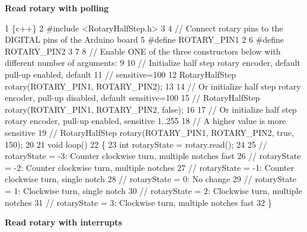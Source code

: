 {\bfseries Read rotary with polling} 
\begin{DoxyCode}
1 \{c++\}
2 #include <RotaryHalfStep.h>
3 
4 // Connect rotary pins to the DIGITAL pins of the Arduino board
5 #define ROTARY\_PIN1   2
6 #define ROTARY\_PIN2   3
7 
8 // Enable ONE of the three constructors below with different number of arguments:
9 
10 // Initialize half step rotary encoder, default pull-up enabled, default 
11 // sensitive=100
12 RotaryHalfStep rotary(ROTARY\_PIN1, ROTARY\_PIN2);
13 
14 // Or initialize half step rotary encoder, pull-up disabled, default sensitive=100
15 // RotaryHalfStep rotary(ROTARY\_PIN1, ROTARY\_PIN2, false);
16 
17 // Or initialize half step rotary encoder, pull-up enabled, sensitive 1..255
18 // A higher value is more sensitive
19 // RotaryHalfStep rotary(ROTARY\_PIN1, ROTARY\_PIN2, true, 150);
20 
21 void loop()
22 \{
23   int rotaryState = rotary.read();
24 
25   // rotaryState = -3: Counter clockwise turn, multiple notches fast
26   // rotaryState = -2: Counter clockwise turn, multiple notches
27   // rotaryState = -1: Counter clockwise turn, single notch
28   // rotaryState = 0:  No change
29   // rotaryState = 1:  Clockwise turn, single notch
30   // rotaryState = 2:  Clockwise turn, multiple notches
31   // rotaryState = 3:  Clockwise turn, multiple notches fast
32 \}
\end{DoxyCode}


{\bfseries Read rotary with interrupts}


